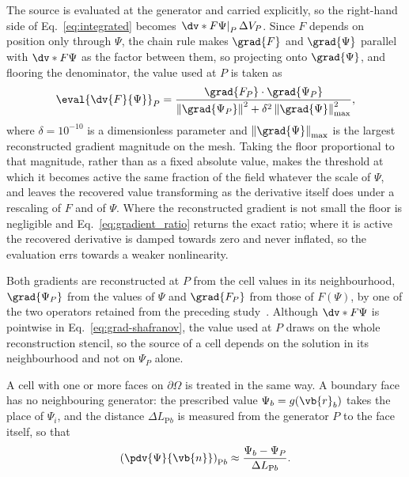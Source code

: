 The source is evaluated at the generator and carried explicitly, so the right-hand side of Eq.~\eqref{eq:integrated} becomes $\left.\dv*{F}{\Psi}\right|_{P}\Delta V_P$. Since $F$ depends on position only through $\Psi$, the chain rule makes $\grad{F}$ and $\grad{\Psi}$ parallel with $\dv*{F}{\Psi}$ as the factor between them, so projecting onto $\grad{\Psi}$, and flooring the denominator, the value used at $P$ is taken as
\begin{equation}
  \eval{\dv{F}{\Psi}}_P
  = \frac{\grad{F_P} \cdot \grad{\Psi_P}}
         {\left\| \grad{\Psi_P} \right\|^{2} + \delta^{2} \left\| \grad{\Psi} \right\|_{\max}^{2}} ,
  \label{eq:gradient_ratio}
\end{equation}
where $\delta=10^{-10}$ is a dimensionless parameter and $\left\|\grad{\Psi}\right\|_{\max}$ is the largest reconstructed gradient magnitude on the mesh. Taking the floor proportional to that magnitude, rather than as a fixed absolute value, makes the threshold at which it becomes active the same fraction of the field whatever the scale of $\Psi$, and leaves the recovered value transforming as the derivative itself does under a rescaling of $F$ and of $\Psi$. Where the reconstructed gradient is not small the floor is negligible and Eq.~\eqref{eq:gradient_ratio} returns the exact ratio; where it is active the recovered derivative is damped towards zero and never inflated, so the evaluation errs towards a weaker nonlinearity.

Both gradients are reconstructed at $P$ from the cell values in its neighbourhood, $\grad{\Psi_P}$ from the values of $\Psi$ and $\grad{F_P}$ from those of $F(\Psi)$, by one of the two operators retained from the preceding study~\cite{Vasconcellos2026GradientCost}. Although $\dv*{F}{\Psi}$ is pointwise in Eq.~\eqref{eq:grad-shafranov}, the value used at $P$ draws on the whole reconstruction stencil, so the source of a cell depends on the solution in its neighbourhood and not on $\Psi_P$ alone.

A cell with one or more faces on $\partial\Omega$ is treated in the same way. A boundary face has no neighbouring generator: the prescribed value $\Psi_b = g(\vb{r}_b)$ takes the place of $\Psi_i$, and the distance $\Delta L_{\mathrm{P}b}$ is measured from the generator $P$ to the face itself, so that
\begin{equation}
  \left( \pdv{\Psi}{\vb{n}} \right)_{\mathrm{P}b} \approx \frac{\Psi_b - \Psi_P}{\Delta L_{\mathrm{P}b}} .
  \label{eq:boundary_face}
\end{equation}


